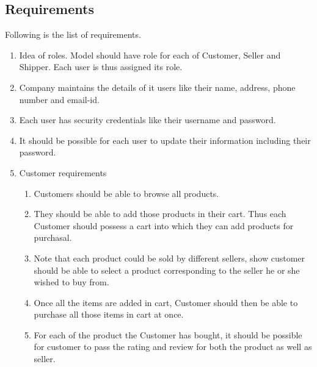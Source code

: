 \documentclass[a4paper,12pt]{article}
\begin{document}
\subsection{Requirements}
Following is the list of requirements.
\begin{enumerate}
  \item Idea of roles. Model should have role for each of Customer, Seller and Shipper. Each user is thus assigned its role.

  \item Company maintains the details of it users like their name, address, phone number and email-id.

  \item Each user has security credentials like their username and password.
  \item It should be possible for each user to update their information including their password.
  \item Customer requirements
  \begin{enumerate}
    \item Customers should be able to browse all products.
    \item They should be able to add those products in their cart. Thus each Customer should possess a cart into which they can add products for purchasal.
    \item Note that each product could be sold by different sellers, show customer should be able to select a product corresponding to the seller he or she wished to buy from. 
    \item Once all the items are added in cart, Customer should then be able to purchase all those items in cart at once.
    \item For each of the product the Customer has bought, it should be possible for customer to pass the rating and review for both the product as well as seller. 
  \end{enumerate}


\end{enumerate}
\end{document}
